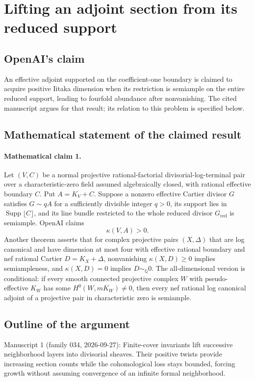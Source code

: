 \documentclass[11pt]{article}
\begin{document}
\section*{Lifting an adjoint section from its reduced support}

\subsection{OpenAI's claim}
An effective adjoint supported on the coefficient-one boundary is claimed to acquire positive Iitaka dimension when its restriction is semiample on the entire reduced support, leading to fourfold abundance after nonvanishing. The cited manuscript argues for that result; its relation to this problem is specified below.

\subsection{Mathematical statement of the claimed result}
\paragraph{Mathematical claim 1.} Let $(V,C)$ be a normal projective rational-factorial divisorial-log-terminal pair over a characteristic-zero field assumed algebraically closed, with rational effective boundary $C$. Put $A=K_V+C$. Suppose a nonzero effective Cartier divisor $G$ satisfies $G\sim qA$ for a sufficiently divisible integer $q>0$, its support lies in $\operatorname{Supp}\lfloor C\rfloor$, and its line bundle restricted to the whole reduced divisor $G_{\mathrm{red}}$ is semiample. OpenAI claims
\[
\kappa(V,A)>0.
\]
Another theorem asserts that for complex projective pairs $(X,\Delta)$ that are log canonical and have dimension at most four with effective rational boundary and nef rational Cartier $D=K_X+\Delta$, nonvanishing $\kappa(X,D)\ge0$ implies semiampleness, and $\kappa(X,D)=0$ implies $D\sim_{\mathbb Q}0$.
The all-dimensional version is conditional: if every smooth connected projective complex $W$ with pseudo-effective $K_W$ has some $H^0(W,mK_W)\ne0$, then every nef rational log canonical adjoint of a projective pair in characteristic zero is semiample.

\subsection{Outline of the argument}
Manuscript 1 (family 034, 2026-09-27): Finite-cover invariants lift successive neighborhood layers into divisorial sheaves. Their positive twists provide increasing section counts while the cohomological loss stays bounded, forcing growth without assuming convergence of an infinite formal neighborhood.
\end{document}
